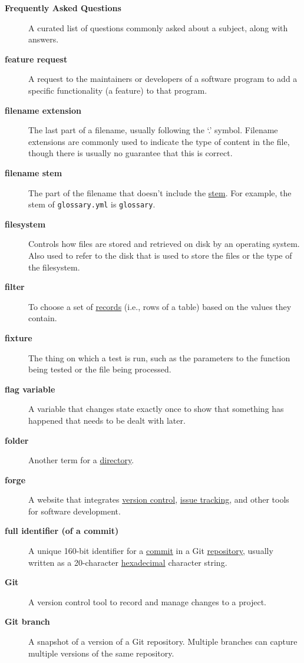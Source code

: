 \documentclass[
]{krantz}
\begin{document}
\begin{description}
\item[\textbf{Frequently Asked Questions}]
A curated list of questions commonly asked about a subject, along with answers.
\item[\textbf{feature request}]
A request to the maintainers or developers of a software program to add a specific functionality (a feature) to that program.
\item[\textbf{filename extension}]
The last part of a filename, usually following the `.' symbol. Filename extensions are commonly used to indicate the type of content in the file, though there is usually no guarantee that this is correct.
\item[\textbf{filename stem}]
The part of the filename that doesn't include the \protect\hyperlink{filename_stem}{stem}. For example, the stem of \texttt{glossary.yml} is \texttt{glossary}.
\item[\textbf{filesystem}]
Controls how files are stored and retrieved on disk by an operating system. Also used to refer to the disk that is used to store the files or the type of the filesystem.
\item[\textbf{filter}]
To choose a set of \protect\hyperlink{record}{records} (i.e., rows of a table) based on the values they contain.
\item[\textbf{fixture}]
The thing on which a test is run, such as the parameters to the function being tested or the file being processed.
\item[\textbf{flag variable}]
A variable that changes state exactly once to show that something has happened that needs to be dealt with later.
\item[\textbf{folder}]
Another term for a \protect\hyperlink{directory}{directory}.
\item[\textbf{forge}]
A website that integrates \protect\hyperlink{version_control}{version control}, \protect\hyperlink{issue_tracking_system}{issue tracking}, and other tools for software development.
\item[\textbf{full identifier (of a commit)}]
A unique 160-bit identifier for a \protect\hyperlink{commit}{commit} in a Git \protect\hyperlink{repository}{repository}, usually written as a 20-character \protect\hyperlink{hexadecimal}{hexadecimal} character string.
\item[\textbf{Git}]
A version control tool to record and manage changes to a project.
\item[\textbf{Git branch}]
A snapshot of a version of a Git repository. Multiple branches can capture multiple versions of the same repository.

\end{description}
\end{document}
